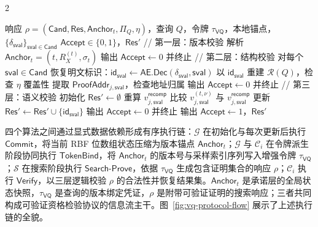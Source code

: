 \begin{algorithm}[!h]
\caption{客户端验证算法 $\mathsf{Verify}$}
\label{alg:vq-verify}
\begingroup
\small
\setlength{\algorithmicindent}{1em}
\setlength{\columnsep}{1em}
\begin{multicols}{2}
\begin{algorithmic}[1]
\REQUIRE 响应 $\rho=(\mathsf{Cand},\mathsf{Res},\mathsf{Anchor}_t,\Pi_Q,\eta)$，查询 $Q$，令牌 $\tau_{\mathsf{VQ}}$，本地锚点，$\{\delta_{\mathsf{sval}}\}_{\mathsf{sval}\in\mathsf{Cand}}$
\ENSURE $\mathsf{Accept}\in\{0,1\}$，$\mathsf{Res}'$
\STATE // 第一层：版本校验
\STATE 解析 $\mathsf{Anchor}_t=(t,R_X^{(t)},\sigma_t)$
  \STATE 输出 $\mathsf{Accept}\leftarrow 0$ 并终止
\ENDIF
\STATE // 第二层：结构校验
\STATE 对每个 $\mathsf{sval}\in\mathsf{Cand}$ 恢复明文标识：$\mathsf{id}_{\mathsf{sval}}\leftarrow\mathsf{AE.Dec}(\delta_{\mathsf{sval}},\mathsf{sval})$
\STATE 以 $\mathsf{id}_{\mathsf{sval}}$ 重建 $\mathcal{R}(Q)$，检查 $\eta$ 覆盖性
  \STATE 提取 $\mathsf{ProofAddr}_{j,\mathsf{sval}}$，检查地址归属
      \STATE 输出 $\mathsf{Accept}\leftarrow 0$ 并终止
    \ENDIF
  \ENDFOR
\ENDFOR
\STATE // 第三层：语义校验
\STATE 初始化 $\mathsf{Res}'\leftarrow\emptyset$
  \STATE 重算 $v_{j,\mathsf{sval}}^{\mathsf{recomp}}$
  \STATE 比较 $v_{j,\mathsf{sval}}^{(t,\nu)}$ 与 $v_{j,\mathsf{sval}}^{\mathsf{recomp}}$
    \STATE 更新 $\mathsf{Res}'\leftarrow\mathsf{Res}'\cup\{\mathsf{id}_{\mathsf{sval}}\}$
  \ENDIF
\ENDFOR
{}
  \STATE 输出 $\mathsf{Accept}\leftarrow 0$ 并终止
\ENDIF
\STATE 输出 $\mathsf{Accept}\leftarrow 1$，$\mathsf{Res}'$
\end{algorithmic}
\end{multicols}
\endgroup
\end{algorithm}

四个算法之间通过显式数据依赖形成有序执行链：$\mathcal{G}$ 在初始化与每次更新后执行 $\mathsf{Commit}$，将当前 RBF 位数组状态压缩为版本锚点 $\mathsf{Anchor}_t$；$\mathcal{G}$ 与 $\mathcal{C}_i$ 在令牌派生阶段协同执行 $\mathsf{TokenBind}$，将 $\mathsf{Anchor}_t$ 的版本号与采样索引序列写入增强令牌 $\tau_{\mathsf{VQ}}$；$\mathcal{S}$ 在搜索阶段执行 $\mathsf{Search\text{-}Prove}$，依据 $\tau_{\mathsf{VQ}}$ 生成包含证明集合的响应 $\rho$；$\mathcal{C}_i$ 执行 $\mathsf{Verify}$，以三层逻辑校验 $\rho$ 的合法性并恢复结果集。$\mathsf{Anchor}_t$ 是承诺层的全局状态快照，$\tau_{\mathsf{VQ}}$ 是查询的版本绑定凭证，$\rho$ 是附带可验证证明的搜索响应；三者共同构成可验证资格检验协议的信息流主干。图~\ref{fig:vq-protocol-flow} 展示了上述执行链的全貌。

